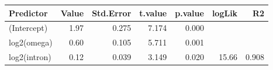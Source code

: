 \begin{table}[ht]
\centering
\begin{tabular}{lrrrrrr}
  \hline
Predictor & Value & Std.Error & t.value & p.value & logLik & R2 \\ 
  \hline
(Intercept) & 1.97 & 0.275 & 7.174 & 0.000 &  &  \\ 
  log2(omega) & 0.60 & 0.105 & 5.711 & 0.001 &  &  \\ 
  log2(intron) & 0.12 & 0.039 & 3.149 & 0.020 & 15.66 & 0.908 \\ 
   \hline
\end{tabular}
\end{table}
